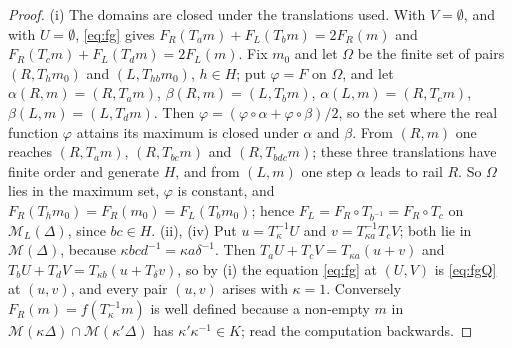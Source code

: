 \begin{proof}
(i) The domains are closed under the translations used. With $V=\emptyset$, and with $U=\emptyset$, \eqref{eq:fg} gives $F_R(T_am)+F_L(T_bm)=2F_R(m)$ and $F_R(T_cm)+F_L(T_dm)=2F_L(m)$. Fix $m_0$ and let $\Omega$ be the finite set of pairs $(R,T_hm_0)$ and $(L,T_{hb}m_0)$, $h\in H$; put $\varphi=F$ on $\Omega$, and let $\alpha(R,m)=(R,T_am)$, $\beta(R,m)=(L,T_bm)$, $\alpha(L,m)=(R,T_cm)$, $\beta(L,m)=(L,T_dm)$. Then $\varphi=(\varphi\circ\alpha+\varphi\circ\beta)/2$, so the set where the real function $\varphi$ attains its maximum is closed under $\alpha$ and $\beta$. From $(R,m)$ one reaches $(R,T_am)$, $(R,T_{bc}m)$ and $(R,T_{bdc}m)$; these three translations have finite order and generate $H$, and from $(L,m)$ one step $\alpha$ leads to rail $R$. So $\Omega$ lies in the maximum set, $\varphi$ is constant, and $F_R(T_hm_0)=F_R(m_0)=F_L(T_bm_0)$; hence $F_L=F_R\circ T_{b^{-1}}=F_R\circ T_c$ on $\mathcal{M}_L(\Delta)$, since $bc\in H$.
(ii), (iv) Put $u=T_{\kappa}^{-1}U$ and $v=T_{\kappa a}^{-1}T_cV$; both lie in $\mathcal{M}(\Delta)$, because $\kappa bcd^{-1}=\kappa a\delta^{-1}$. Then $T_aU+T_cV=T_{\kappa a}(u+v)$ and $T_bU+T_dV=T_{\kappa b}(u+T_\delta v)$, so by (i) the equation \eqref{eq:fg} at $(U,V)$ is \eqref{eq:fgQ} at $(u,v)$, and every pair $(u,v)$ arises with $\kappa=1$. Conversely $F_R(m)=f(T_\kappa^{-1}m)$ is well defined because a non-empty $m$ in $\mathcal{M}(\kappa\Delta)\cap\mathcal{M}(\kappa'\Delta)$ has $\kappa'\kappa^{-1}\in K$; read the computation backwards.

\end{proof}
